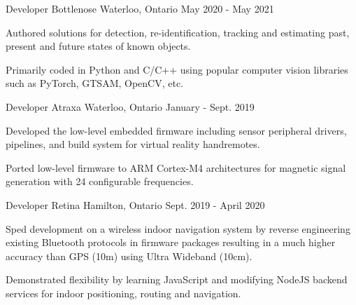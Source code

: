 
\begin{cventries}

  \cventry
    {Developer} %
    {Bottlenose} %
    {Waterloo, Ontario} %
    {May 2020 - May 2021} %
    {
      \begin{cvitems} %
        \item {Authored solutions for detection, re-identification, tracking and estimating past, present and future states of known objects.}
        \item {Primarily coded in Python and C/C++ using popular computer vision libraries such as PyTorch, GTSAM, OpenCV, etc.}
      \end{cvitems}
    }

  \cventry
    {Developer} %
    {Atraxa} %
    {Waterloo, Ontario} %
    {January - Sept. 2019} %
    {
      \begin{cvitems} %
        \item {Developed the low-level embedded firmware including sensor peripheral drivers, pipelines, and build system for virtual reality handremotes.}
        \item {Ported low-level firmware to ARM Cortex-M4 architectures for magnetic signal generation with 24 configurable frequencies.}
      \end{cvitems}
    }

  \cventry
    {Developer} %
    {Retina} %
    {Hamilton, Ontario} %
    {Sept. 2019 - April 2020} %
    {
      \begin{cvitems} %
        \item {Sped development on a wireless indoor navigation system by reverse engineering existing Bluetooth protocols in firmware packages resulting in a much higher accuracy than GPS (10m) using Ultra Wideband (10cm).}
        \item {Demonstrated flexibility by learning JavaScript and modifying NodeJS backend services for indoor positioning, routing and navigation.}
      \end{cvitems}
    }


\end{cventries}

